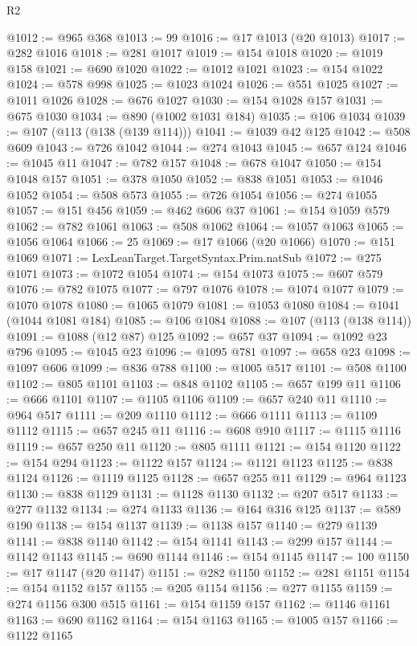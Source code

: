 \begin{lexlean}{R2}
\begin{coremodule}
@1012 := @965 @368
@1013 := 99
@1016 := @17 @1013 (@20 @1013)
@1017 := @282 @1016
@1018 := @281 @1017
@1019 := @154 @1018
@1020 := @1019 @158
@1021 := @690 @1020
@1022 := @1012 @1021
@1023 := @154 @1022
@1024 := @578 @998
@1025 := @1023 @1024
@1026 := @551 @1025
@1027 := @1011 @1026
@1028 := @676 @1027
@1030 := @154 @1028 @157
@1031 := @675 @1030
@1034 := @890 (@1002 @1031 @184)
@1035 := @106 @1034
@1039 := @107 (@113 (@138 (@139 @114)))
@1041 := @1039 @42 @125
@1042 := @508 @609
@1043 := @726 @1042
@1044 := @274 @1043
@1045 := @657 @124
@1046 := @1045 @11
@1047 := @782 @157
@1048 := @678 @1047
@1050 := @154 @1048 @157
@1051 := @378 @1050
@1052 := @838 @1051
@1053 := @1046 @1052
@1054 := @508 @573
@1055 := @726 @1054
@1056 := @274 @1055
@1057 := @151 @456
@1059 := @462 @606 @37
@1061 := @154 @1059 @579
@1062 := @782 @1061
@1063 := @508 @1062
@1064 := @1057 @1063
@1065 := @1056 @1064
@1066 := 25
@1069 := @17 @1066 (@20 @1066)
@1070 := @151 @1069
@1071 := LexLeanTarget.TargetSyntax.Prim.natSub
@1072 := @275 @1071
@1073 := @1072 @1054
@1074 := @154 @1073
@1075 := @607 @579
@1076 := @782 @1075
@1077 := @797 @1076
@1078 := @1074 @1077
@1079 := @1070 @1078
@1080 := @1065 @1079
@1081 := @1053 @1080
@1084 := @1041 (@1044 @1081 @184)
@1085 := @106 @1084
@1088 := @107 (@113 (@138 @114))
@1091 := @1088 (@12 @87) @125
@1092 := @657 @37
@1094 := @1092 @23 @796
@1095 := @1045 @23
@1096 := @1095 @781
@1097 := @658 @23
@1098 := @1097 @606
@1099 := @836 @788
@1100 := @1005 @517
@1101 := @508 @1100
@1102 := @805 @1101
@1103 := @848 @1102
@1105 := @657 @199 @11
@1106 := @666 @1101
@1107 := @1105 @1106
@1109 := @657 @240 @11
@1110 := @964 @517
@1111 := @209 @1110
@1112 := @666 @1111
@1113 := @1109 @1112
@1115 := @657 @245 @11
@1116 := @608 @910
@1117 := @1115 @1116
@1119 := @657 @250 @11
@1120 := @805 @1111
@1121 := @154 @1120
@1122 := @154 @294
@1123 := @1122 @157
@1124 := @1121 @1123
@1125 := @838 @1124
@1126 := @1119 @1125
@1128 := @657 @255 @11
@1129 := @964 @1123
@1130 := @838 @1129
@1131 := @1128 @1130
@1132 := @207 @517
@1133 := @277 @1132
@1134 := @274 @1133
@1136 := @164 @316 @125
@1137 := @589 @190
@1138 := @154 @1137
@1139 := @1138 @157
@1140 := @279 @1139
@1141 := @838 @1140
@1142 := @154 @1141
@1143 := @299 @157
@1144 := @1142 @1143
@1145 := @690 @1144
@1146 := @154 @1145
@1147 := 100
@1150 := @17 @1147 (@20 @1147)
@1151 := @282 @1150
@1152 := @281 @1151
@1154 := @154 @1152 @157
@1155 := @205 @1154
@1156 := @277 @1155
@1159 := @274 @1156 @300 @515
@1161 := @154 @1159 @157
@1162 := @1146 @1161
@1163 := @690 @1162
@1164 := @154 @1163
@1165 := @1005 @157
@1166 := @1122 @1165

\end{coremodule}
\end{lexlean}

